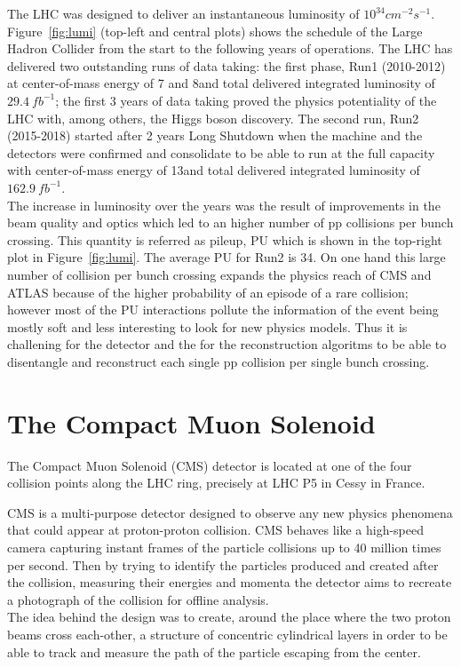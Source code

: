 The LHC was designed to deliver an instantaneous luminosity
of $10^{34}cm^{-2}s^{-1}$. Figure~\ref{fig:lumi} (top-left and central
plots) shows the schedule of the Large Hadron Collider from the start
to the following years of operations. The LHC has delivered two
outstanding runs of data taking: the first phase, Run1 (2010-2012) at
center-of-mass energy of 7 and 8\TeV and total delivered integrated
luminosity of $29.4\ fb^{-1}$; the first 3 years of data taking proved
the physics potentiality of the LHC with, among others, the Higgs boson
discovery. The second run, Run2 (2015-2018) started after 2 years Long
Shutdown when the machine and the detectors were confirmed and
consolidate to be able to run at the full capacity with 
center-of-mass energy of 13\TeV and total delivered integrated
luminosity of $162.9\ fb^{-1}$.\\
The increase in luminosity over the
years was the result of improvements in the beam quality and optics which
led to an higher number of pp collisions per bunch crossing. This
quantity is referred as pileup, PU which is shown in the top-right plot
in Figure~\ref{fig:lumi}. The average \textlangle{}PU\textrangle{} for
Run2 is 34. On one hand this large
number of collision per bunch crossing 
expands the physics reach of CMS and ATLAS because of
the higher probability of an episode of a rare collision; however
most of the PU interactions pollute the information of the
event being mostly soft and less interesting to look for
new physics models. Thus it is challening for the detector and the for
the reconstruction algoritms to be able 
to disentangle and reconstruct each single pp collision per single
bunch crossing.

\section{The Compact Muon Solenoid}\label{cms}

The Compact Muon Solenoid (CMS) detector is located at one of the four
collision points along the LHC ring, precisely at LHC P5 in Cessy in
France.  

CMS is a multi-purpose detector designed to observe any new physics
phenomena that could appear at proton-proton collision. CMS behaves
like a high-speed camera capturing instant frames of the particle
collisions up to 40 million times per second. Then by trying to
identify the particles produced and created after the collision,
measuring their energies and momenta the detector aims to recreate a
photograph of the collision for offline analysis. \\
The idea behind the design was to create, around the place where the
two proton beams cross each-other, a structure of concentric cylindrical layers
in order to be able to track and measure the path of the particle
escaping from the center.   

